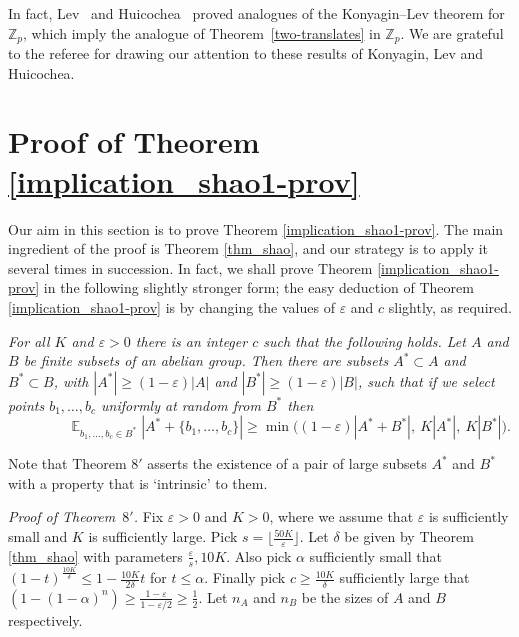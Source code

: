 \documentclass[12pt,reqno]{amsart}
\DeclareMathOperator*{\E}{\mathbb{E}}
\theoremstyle{definition}
\renewcommand\leq{\leqslant}
\renewcommand\geq{\geqslant}
\renewcommand\ge{\geqslant}
\begin{document}
\vspace{5pt}
In fact, Lev~\cite{Levtwo} and Huicochea~\cite{Hui} proved analogues of the Konyagin--Lev theorem
for ${\mathbb Z}_p$, which imply the analogue of Theorem~\ref{two-translates} in ${\mathbb Z}_p$.
We are grateful to the referee for drawing our attention to these results of Konyagin, Lev and
Huicochea.



\vspace{5pt}

\section{Proof of Theorem \ref{implication_shao1-prov}}

Our aim in this section is to prove Theorem \ref{implication_shao1-prov}. The main
ingredient of the proof is Theorem \ref{thm_shao}, and our strategy is to
apply it several times in succession. In fact, we shall prove Theorem \ref{implication_shao1-prov}
in the following slightly stronger form; the easy deduction of Theorem \ref{implication_shao1-prov}
is by changing the values of $\varepsilon$ and $c$ slightly, as required.

\vspace{7pt}

 {\em For all $K$ and $\varepsilon >0$ there is an integer $c$ such that the following holds.
Let $A$ and $B$ be finite subsets of an abelian group. Then there are subsets $A^* \subset A$
and $B^* \subset B$, with $|A^*|\ge (1-\varepsilon)|A|$ and
$|B^*|\ge (1-\varepsilon)|B|$, such that if we select points $b_1,\hdots,b_c$ uniformly at random from
$B^*$ then
\[
\hspace{51pt}      \E_{b_1, \hdots, b_c \in B^*} |A^*+ \{b_1,\hdots,b_c\}|
 \geq \min\big( (1-\varepsilon)|A^*+ B^*|,\ K |A^*|,\ K |B^*| \big). \hspace{60pt}
\]
}

\vspace{-5pt}
\noindent
Note that Theorem $8'$ asserts the existence of a pair of large subsets $A^*$ and $B^*$ with a property that is
`intrinsic' to them.

\vspace{5pt}
\noindent
{\em Proof of Theorem~$8'$.}
Fix $\varepsilon>0$  and $K>0$, where we assume that $\varepsilon$ is sufficiently small and
$K$ is sufficiently large.
Pick $s=\lfloor \frac{50K}{\varepsilon} \rfloor$. Let
$\delta$ be given by Theorem \ref{thm_shao} with parameters $\frac{\varepsilon}{s}, 10K$.
Also pick  $\alpha$ sufficiently small that
$(1-t)^{\frac{10K}{\delta}}\leq 1-\frac{10K}{2\delta}t$ for $t \leq \alpha$. Finally pick $c\geq \frac{10K}{\delta}$ sufficiently large that
$(1-(1-\alpha)^n) \geq \frac{1-\varepsilon}{1-\varepsilon/2} \geq \frac{1}{2}$. Let  $n_A$ and $n_B$ be the sizes of $A$ and $B$ respectively.
\end{document}
